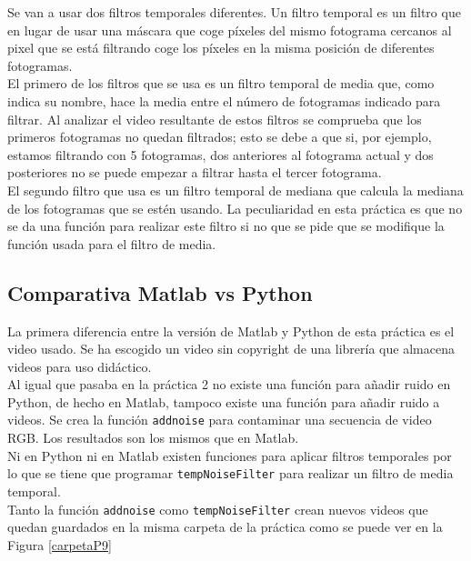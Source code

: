\documentclass[a4paper,12pt]{report}
\begin{document}
Se van a usar dos filtros temporales diferentes. Un filtro temporal es un filtro que en lugar de usar una máscara que coge píxeles del mismo fotograma cercanos al pixel que se está filtrando coge los píxeles en la misma posición de diferentes fotogramas.\\

El primero de los filtros que se usa es un filtro temporal de media que, como indica su nombre, hace la media  entre el número de fotogramas indicado para filtrar. Al analizar el video resultante de estos filtros se comprueba que los primeros fotogramas no quedan filtrados; esto se debe a que si, por ejemplo, estamos filtrando con 5 fotogramas, dos anteriores al fotograma actual y dos posteriores no se puede empezar a filtrar hasta el tercer fotograma.\\

El segundo filtro que usa es un filtro temporal de mediana que calcula la mediana de los fotogramas que se estén usando. La peculiaridad en esta práctica es que no se da una función para realizar este filtro si no que se pide que se modifique la función usada para el filtro de media.\\

\subsection{Comparativa Matlab vs Python}

La primera diferencia entre la versión de Matlab y Python de esta práctica es el video usado. Se ha escogido un video sin copyright de una librería que almacena videos para uso didáctico.\\

Al igual que pasaba en la práctica 2 no existe una función para añadir ruido en Python, de hecho en Matlab, tampoco existe una función para añadir ruido a videos. Se crea la función \texttt{addnoise} para contaminar una secuencia de video RGB. Los resultados son los mismos que en Matlab.\\

Ni en Python ni en Matlab existen funciones para aplicar filtros temporales por lo que se tiene que programar \texttt{tempNoiseFilter} para realizar un filtro de media temporal.\\ 

Tanto la función \texttt{addnoise} como \texttt{tempNoiseFilter} crean nuevos videos que quedan guardados en la misma carpeta de la práctica como se puede ver en la Figura \ref{carpetaP9}
\end{document}
